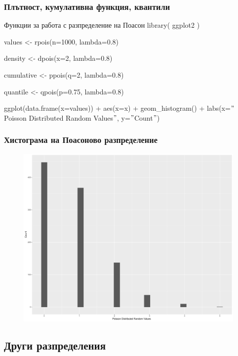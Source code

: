 \documentclass{beamer}
\begin{document}
\begin{frame}
\frametitle{Плътност, кумулативна функция, квантили}
\begin{block}{Функции за работа с разпределение на Поасон}
library( ggplot2 )

values <- rpois(n=1000, lambda=0.8)

density <- dpois(x=2, lambda=0.8)

cumulative <- ppois(q=2, lambda=0.8)

quantile <- qpois(p=0.75, lambda=0.8)

ggplot(data.frame(x=values)) + aes(x=x) + geom\_histogram() + labs(x=$"$Poisson Distributed Random Values$"$, y=$"$Count$"$)
\end{block}
\end{frame}

\begin{frame}
\frametitle{Хистограма на Поасоново разпределение}
\begin{figure}[]\includegraphics[width=\textwidth,height=0.75\textheight]{pic0054}\end{figure}
\end{frame}

\subsection{Други разпределения}
\end{document}
